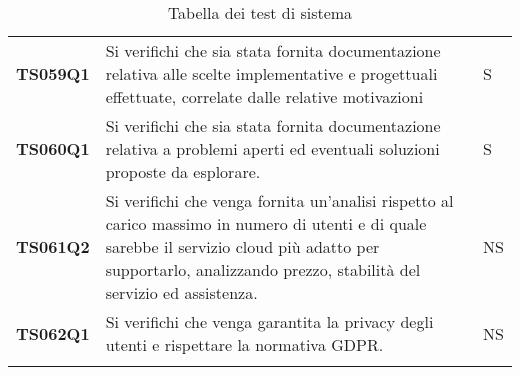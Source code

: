 \documentclass[../piano-di-qualifica.tex]{subfiles}
\begin{document}
\begin{longtable}[H]{>{\centering\bfseries}m{3cm} >{}m{10cm} >{\centering\arraybackslash}m{3cm}}
  TS059Q1            & Si verifichi che sia stata fornita documentazione relativa alle scelte implementative e progettuali effettuate, correlate dalle relative motivazioni
                     & S                                                                                                                                                                                                                                                               \\                                                                                                                                                                                                                                                       

  TS060Q1            & Si verifichi che sia stata fornita documentazione relativa a problemi aperti ed eventuali soluzioni proposte da esplorare.
                     & S                                                                                                                                                                                                                                                               \\                                                                                                                                                                                                                                                       

  TS061Q2            & Si verifichi che venga fornita un'analisi rispetto al carico massimo in numero di utenti e di quale sarebbe il servizio cloud più adatto per supportarlo, analizzando prezzo, stabilità del servizio ed assistenza.
                     & NS                                                                                                                                                                                                                                                               \\

  TS062Q1            & Si verifichi che venga garantita la privacy degli utenti e rispettare la normativa GDPR\@.
                     & NS                                                                                                                                                                                                                                                               \\
  \rowcolor{white}
  \caption{Tabella dei test di sistema}%
  \label{tab:test_sistema}
\end{longtable}
\end{document}

